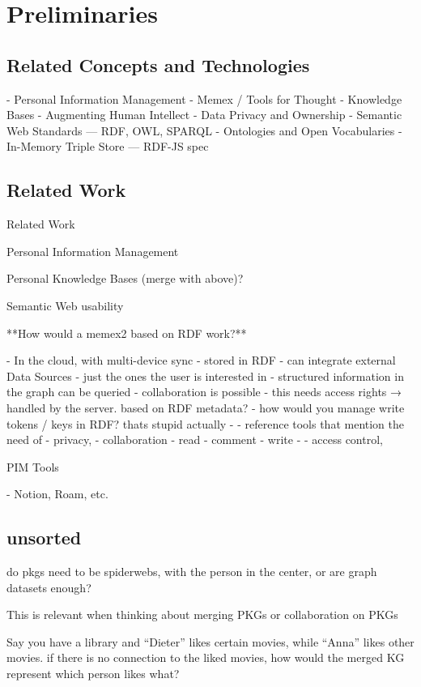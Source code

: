 \chapter{Preliminaries}
\section{Related Concepts and Technologies}

- Personal Information Management
- Memex / Tools for Thought
- Knowledge Bases
- Augmenting Human Intellect
- Data Privacy and Ownership
- Semantic Web Standards — RDF, OWL, SPARQL
- Ontologies and Open Vocabularies
- In-Memory Triple Store — RDF-JS spec
\section{Related Work}

Related Work

Personal Information Management

Personal Knowledge Bases (merge with above)?

Semantic Web usability

**How would a memex2 based on RDF work?**

- In the cloud, with multi-device sync
- stored in RDF
- can integrate external  Data Sources
    - just the ones  the user is interested in
- structured information in the graph can be queried
- collaboration is possible
    - this needs access rights → handled by the server. based on RDF metadata?
        - how would you manage write tokens / keys in RDF? thats stupid actually
- 
- reference tools that mention the need of
    - privacy,
    - collaboration
        - read
        - comment
        - write
        - 
    - access control,

PIM Tools

- Notion, Roam, etc.

\section{unsorted}
do pkgs need to be spiderwebs, with the person in the center, or are graph datasets enough?

This is relevant when thinking about merging PKGs or collaboration on PKGs

Say you have a library and “Dieter” likes certain movies, while “Anna” likes other movies.
if there is no connection to the liked movies, how would the merged KG represent which person likes what?

